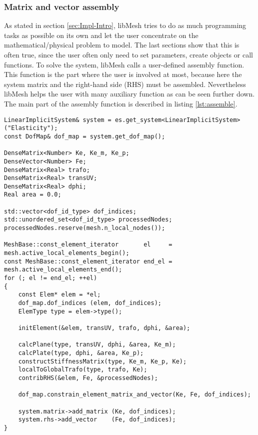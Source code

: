    
  \subsubsection{Matrix and vector assembly}\label{sec:Impl-Details-Assembly}
  As stated in section \ref{sec:Impl-Intro}, libMesh tries to do as much programming tasks as possible on its own and let the user concentrate on the mathematical/physical problem to model. The last sections show that this is often true, since the user often only need to set parameters, create objects or call functions. To solve the system, libMesh calls a user-defined assembly function. This function is the part where the user is involved at most, because here the system matrix and the right-hand side (RHS) must be assembled. Nevertheless libMesh helps the user with many auxiliary function as can be seen further down. The main part of the assembly function is described in listing \ref{lst:assemble}.
\begin{lstlisting}[caption=Assemble System Matrix and RHS,label=lst:assemble,float]
LinearImplicitSystem& system = es.get_system<LinearImplicitSystem>("Elasticity");
const DofMap& dof_map = system.get_dof_map();

DenseMatrix<Number> Ke, Ke_m, Ke_p;
DenseVector<Number> Fe;
DenseMatrix<Real> trafo;
DenseMatrix<Real> transUV;
DenseMatrix<Real> dphi;
Real area = 0.0;

std::vector<dof_id_type> dof_indices;
std::unordered_set<dof_id_type> processedNodes;
processedNodes.reserve(mesh.n_local_nodes());

MeshBase::const_element_iterator       el     = mesh.active_local_elements_begin();
const MeshBase::const_element_iterator end_el = mesh.active_local_elements_end();
for (; el != end_el; ++el)
{
	const Elem* elem = *el;
	dof_map.dof_indices (elem, dof_indices);
	ElemType type = elem->type();

	initElement(&elem, transUV, trafo, dphi, &area);

	calcPlane(type, transUV, dphi, &area, Ke_m);
	calcPlate(type, dphi, &area, Ke_p);
	constructStiffnessMatrix(type, Ke_m, Ke_p, Ke);
	localToGlobalTrafo(type, trafo, Ke);
	contribRHS(&elem, Fe, &processedNodes);

	dof_map.constrain_element_matrix_and_vector(Ke, Fe, dof_indices);

	system.matrix->add_matrix (Ke, dof_indices);
	system.rhs->add_vector    (Fe, dof_indices);
}
\end{lstlisting}
